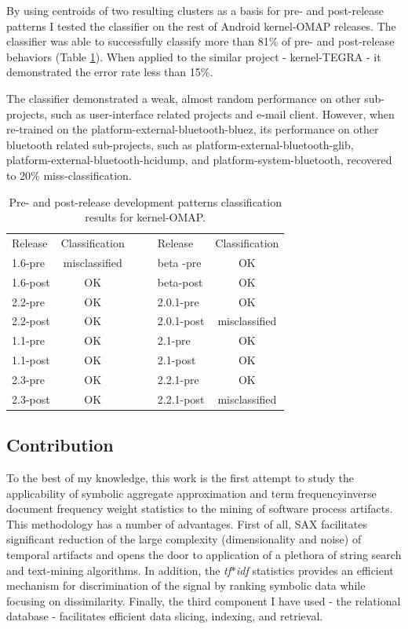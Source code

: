\documentclass[conference]{worldcomp}
\begin{document}
By using centroids of two resulting clusters as a basis for pre- and post-release patterns I tested 
the classifier on the rest of Android kernel-OMAP releases. The classifier was able to successfully classify 
more than 81\% of pre- and post-release behaviors (Table \ref{tab:success}). 
When applied to the similar project - kernel-TEGRA - it demonstrated the error rate less than 15\%.

The classifier demonstrated a weak, almost random performance on other sub-projects, such as user-interface
related projects and e-mail client. However, when re-trained on the platform-external-bluetooth-bluez, 
its performance on other bluetooth related sub-projects, such as platform-external-bluetooth-glib,
platform-external-bluetooth-hcidump, and platform-system-bluetooth, recovered to 20\% miss-classification.

\begin{table}
  \caption{Pre- and post-release development patterns classification results for kernel-OMAP.}
  \label{tab:success}
  \begin{tabular}{ | l | c | c c | l | c |}
  \cline{1-2} \cline{5-6}
  Release & Classification& & & Release & Classification\\
  \cline{1-2} \cline{5-6}
1.6-pre & misclassified & & & beta -pre & OK \\
1.6-post & OK & & & beta-post & OK \\
2.2-pre & OK & & & 2.0.1-pre & OK \\
2.2-post & OK & & & 2.0.1-post & misclassified \\
1.1-pre & OK & & & 2.1-pre & OK \\
1.1-post & OK & & & 2.1-post & OK \\
2.3-pre & OK & & & 2.2.1-pre & OK \\
2.3-post & OK & & & 2.2.1-post & misclassified \\ 
  \cline{1-2} \cline{5-6}
  \end{tabular}
\end{table}

\subsection{Contribution}
To the best of my knowledge, this work is the first attempt to study the applicability
of symbolic aggregate approximation and term frequency\textendash inverse document frequency
weight statistics to the mining of software process artifacts. 
This methodology has a number of advantages. First of all, SAX facilitates significant 
reduction of the large complexity (dimensionality and noise) of temporal artifacts 
and opens the door to application of a plethora of string search and text-mining algorithms.
In addition, the \textit{tf$\ast$idf} statistics provides an efficient mechanism for 
discrimination of the signal by ranking symbolic data while focusing on dissimilarity.
Finally, the third component I have used - the relational database - facilitates 
efficient data slicing, indexing, and retrieval.
\end{document}
